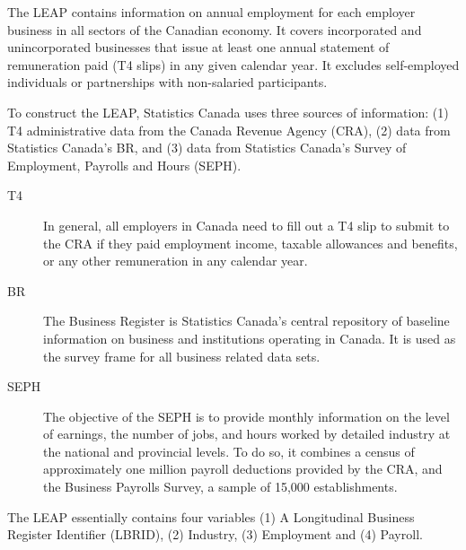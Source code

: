 
The \ac{LEAP} contains information on annual employment for each employer business in all sectors of the Canadian economy. It covers incorporated and unincorporated businesses that issue at least one annual statement of remuneration paid (T4 slips) in any given calendar year. It excludes self-employed individuals or partnerships with non-salaried participants.

To construct the LEAP, Statistics Canada uses three sources of information: (1) T4 administrative data  from the Canada Revenue Agency (CRA), (2) data from Statistics Canada's \ac{BR}, and (3) data from  Statistics Canada's Survey of Employment, Payrolls and Hours (SEPH). 
\begin{description}
\item[T4] In general, all employers in Canada need to fill out a T4 slip to submit to the CRA if they paid employment income, taxable allowances and benefits, or any other remuneration in any calendar year. 

\item[BR] The Business Register is Statistics Canada's central repository of baseline information on business and institutions operating in Canada. It is used as the survey frame for all business related data sets.

\item[SEPH] The objective of the SEPH is to provide monthly information on the level of earnings, the number of jobs, and hours worked by detailed industry at the national and provincial levels. To do so, it combines a census of approximately one million payroll deductions provided by the CRA, and the Business Payrolls Survey, a sample of 15,000 establishments.  
\end{description}
The LEAP essentially contains four variables (1) A Longitudinal Business Register Identifier (LBRID), (2) Industry, (3) Employment and (4) Payroll. 
